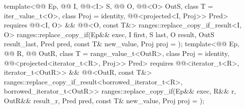 \begin{itemdecl}
template<@@ Ep, @@ I, @@<I> S,
         @@ O, @@<O> OutS, class T = iter_value_t<O>,
         class Proj = identity, @@<projected<I, Proj>> Pred>
  requires @@<I, O> && @@<O, const T&>
  ranges::replace_copy_if_result<I, O>
    ranges::replace_copy_if(Ep&& exec, I first, S last, O result, OutS result_last,
                            Pred pred, const T& new_value, Proj proj = {});
template<@@ Ep, @@ R, @@ OutR,
         class T = range_value_t<OutR>, class Proj = identity,
         @@<projected<iterator_t<R>, Proj>> Pred>
  requires @@<iterator_t<R>, iterator_t<OutR>> &&
           @@<OutR, const T&>
  ranges::replace_copy_if_result<borrowed_iterator_t<R>, borrowed_iterator_t<OutR>>
    ranges::replace_copy_if(Ep&& exec, R&& r, OutR&& result_r, Pred pred, const T& new_value,
                            Proj proj = {});
\end{itemdecl}

